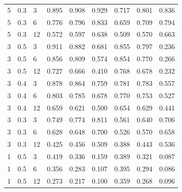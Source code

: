 \begin{refsection}
\begin{otherlanguage}{english}
\begin{scriptsize}
\begin{longtable}{lllllllll}
\cellcolor[HTML]{C0C0C0}5 & \cellcolor[HTML]{C0C0C0}0.3 & \cellcolor[HTML]{C0C0C0}3 & 0.895 & 0.908 & 0.929 & 0.717 & 0.801 & 0.836 \\
\cellcolor[HTML]{C0C0C0}5 & \cellcolor[HTML]{C0C0C0}0.3 & \cellcolor[HTML]{C0C0C0}6 & 0.776 & 0.796 & 0.833 & 0.659 & 0.709 & 0.794 \\
\cellcolor[HTML]{C0C0C0}5 & \cellcolor[HTML]{C0C0C0}0.3 & \cellcolor[HTML]{C0C0C0}12 & 0.572 & 0.597 & 0.638 & 0.509 & 0.570 & 0.663 \\
\cellcolor[HTML]{C0C0C0}3 & \cellcolor[HTML]{C0C0C0}0.5 & \cellcolor[HTML]{C0C0C0}3 & 0.911 & 0.882 & 0.681 & 0.855 & 0.797 & 0.236 \\
\cellcolor[HTML]{C0C0C0}3 & \cellcolor[HTML]{C0C0C0}0.5 & \cellcolor[HTML]{C0C0C0}6 & 0.856 & 0.809 & 0.574 & 0.854 & 0.770 & 0.266 \\
\cellcolor[HTML]{C0C0C0}3 & \cellcolor[HTML]{C0C0C0}0.5 & \cellcolor[HTML]{C0C0C0}12 & 0.727 & 0.666 & 0.410 & 0.768 & 0.678 & 0.232 \\
\cellcolor[HTML]{C0C0C0}3 & \cellcolor[HTML]{C0C0C0}0.4 & \cellcolor[HTML]{C0C0C0}3 & 0.878 & 0.864 & 0.759 & 0.781 & 0.783 & 0.557 \\
\cellcolor[HTML]{C0C0C0}3 & \cellcolor[HTML]{C0C0C0}0.4 & \cellcolor[HTML]{C0C0C0}6 & 0.803 & 0.785 & 0.678 & 0.770 & 0.753 & 0.527 \\
\cellcolor[HTML]{C0C0C0}3 & \cellcolor[HTML]{C0C0C0}0.4 & \cellcolor[HTML]{C0C0C0}12 & 0.659 & 0.621 & 0.500 & 0.654 & 0.629 & 0.441 \\
\cellcolor[HTML]{C0C0C0}3 & \cellcolor[HTML]{C0C0C0}0.3 & \cellcolor[HTML]{C0C0C0}3 & 0.749 & 0.774 & 0.811 & 0.561 & 0.640 & 0.706 \\
\cellcolor[HTML]{C0C0C0}3 & \cellcolor[HTML]{C0C0C0}0.3 & \cellcolor[HTML]{C0C0C0}6 & 0.628 & 0.648 & 0.700 & 0.526 & 0.570 & 0.658 \\
\cellcolor[HTML]{C0C0C0}3 & \cellcolor[HTML]{C0C0C0}0.3 & \cellcolor[HTML]{C0C0C0}12 & 0.425 & 0.456 & 0.509 & 0.388 & 0.443 & 0.536 \\
\cellcolor[HTML]{C0C0C0}1 & \cellcolor[HTML]{C0C0C0}0.5 & \cellcolor[HTML]{C0C0C0}3 & 0.419 & 0.336 & 0.159 & 0.389 & 0.321 & 0.087 \\
\cellcolor[HTML]{C0C0C0}1 & \cellcolor[HTML]{C0C0C0}0.5 & \cellcolor[HTML]{C0C0C0}6 & 0.356 & 0.283 & 0.107 & 0.395 & 0.294 & 0.086 \\
\cellcolor[HTML]{C0C0C0}1 & \cellcolor[HTML]{C0C0C0}0.5 & \cellcolor[HTML]{C0C0C0}12 & 0.273 & 0.217 & 0.100 & 0.359 & 0.268 & 0.096 \\

\end{longtable}
\end{scriptsize}
\end{otherlanguage}
\end{refsection}
